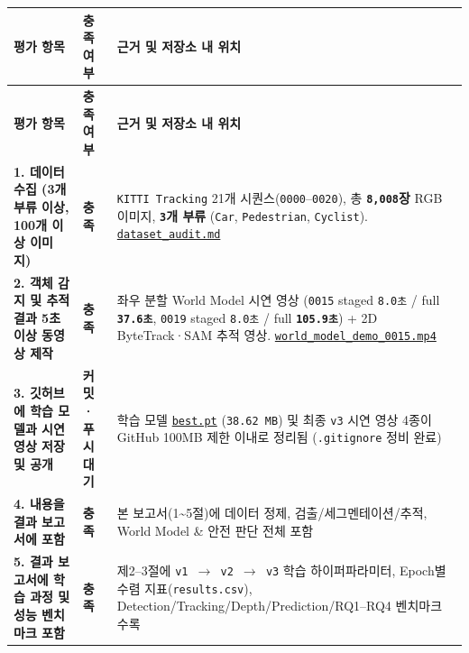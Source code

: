 \documentclass[10.5pt,a4paper]{article}
\begin{document}
\begin{footnotesize}
\setlength{\tabcolsep}{4pt}
\setlength{\LTleft}{0pt}\setlength{\LTright}{0pt}
\begin{longtable}{>{\raggedright\arraybackslash}p{} >{\raggedright\arraybackslash}p{} >{\raggedright\arraybackslash}p{}}
\toprule
\textbf{평가 항목} & \textbf{충족 여부} & \textbf{근거 및 저장소 내 위치} \\
\midrule
\endfirsthead
\toprule
\textbf{평가 항목} & \textbf{충족 여부} & \textbf{근거 및 저장소 내 위치} \\
\midrule
\endhead
\bottomrule
\endfoot
\textbf{1. 데이터 수집 (3개 부류 이상, 100개 이상 이미지)} & \textbf{충족} & \texttt{KITTI Tracking} 21개 시퀀스(\texttt{0000}--\texttt{0020}), 총 \textbf{\texttt{8,\allowbreak{}008}장} RGB 이미지, \textbf{\texttt{3}개 부류} (\texttt{Car}, \texttt{Pedestrian}, \texttt{Cyclist}). \href{https://github.com/Heisnotanimposter/Totalcare\_autonomous\_driving\_Yolov5/blob/main/dataset\_audit.md}{\texttt{dataset\_\allowbreak{}audit.\allowbreak{}md}} \\
\textbf{2. 객체 감지 및 추적 결과 5초 이상 동영상 제작} & \textbf{충족} & 좌우 분할 World Model 시연 영상 (\texttt{0015} staged \texttt{8.\allowbreak{}0초} / full \textbf{\texttt{37.\allowbreak{}6초}}, \texttt{0019} staged \texttt{8.\allowbreak{}0초} / full \textbf{\texttt{105.\allowbreak{}9초}}) + 2D ByteTrack·SAM 추적 영상. \href{https://github.com/Heisnotanimposter/Totalcare\_autonomous\_driving\_Yolov5/blob/main/results/v3\_bev\_fixed/world\_outputs/world\_model\_0015\_full/world\_model\_demo\_0015.mp4}{\texttt{world\_\allowbreak{}model\_\allowbreak{}demo\_\allowbreak{}0015.\allowbreak{}mp4}} \\
\textbf{3. 깃허브에 학습 모델과 시연 영상 저장 및 공개} & \textbf{커밋·푸시 대기} & 학습 모델 \href{https://github.com/Heisnotanimposter/Totalcare\_autonomous\_driving\_Yolov5/blob/main/results/v2\_improved/outputs/weights/best.pt}{\texttt{best.\allowbreak{}pt}} (\texttt{38.\allowbreak{}62 MB}) 및 최종 \texttt{v3} 시연 영상 4종이 GitHub 100MB 제한 이내로 정리됨 (\texttt{.\allowbreak{}gitignore} 정비 완료) \\
\textbf{4. 내용을 결과 보고서에 포함} & \textbf{충족} & 본 보고서(1\textasciitilde{}5절)에 데이터 정제, 검출/세그멘테이션/추적, World Model \& 안전 판단 전체 포함 \\
\textbf{5. 결과 보고서에 학습 과정 및 성능 벤치마크 포함} & \textbf{충족} & 제2--3절에 \texttt{v1 $\rightarrow$ v2 $\rightarrow$ v3} 학습 하이퍼파라미터, Epoch별 수렴 지표(\texttt{results.\allowbreak{}csv}), Detection/Tracking/Depth/Prediction/RQ1--RQ4 벤치마크 수록 \\

\end{longtable}
\end{footnotesize}
\end{document}
